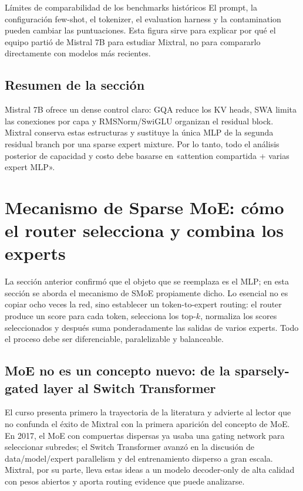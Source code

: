 \documentclass[a4paper]{article}
\begin{document}
\begin{warningbox}{Límites de comparabilidad de los benchmarks históricos}
El prompt, la configuración few-shot, el tokenizer, el evaluation harness y la contamination pueden cambiar las puntuaciones. Esta figura sirve para explicar por qué el equipo partió de Mistral 7B para estudiar Mixtral, no para compararlo directamente con modelos más recientes.
\end{warningbox}

\subsection{Resumen de la sección}

Mistral 7B ofrece un dense control claro: GQA reduce los KV heads, SWA limita las conexiones por capa y RMSNorm/SwiGLU organizan el residual block. Mixtral conserva estas estructuras y sustituye la única MLP de la segunda residual branch por una sparse expert mixture. Por lo tanto, todo el análisis posterior de capacidad y costo debe basarse en «attention compartida + varias expert MLP».
\section{Mecanismo de Sparse MoE: cómo el router selecciona y combina los experts}

La sección anterior confirmó que el objeto que se reemplaza es el MLP; en esta sección se aborda el mecanismo de SMoE propiamente dicho. Lo esencial no es copiar ocho veces la red, sino establecer un token-to-expert routing: el router produce un score para cada token, selecciona los top-$k$, normaliza los scores seleccionados y después suma ponderadamente las salidas de varios experts. Todo el proceso debe ser diferenciable, paralelizable y balanceable.

\subsection{MoE no es un concepto nuevo: de la sparsely-gated layer al Switch Transformer}

El curso presenta primero la trayectoria de la literatura y advierte al lector que no confunda el éxito de Mixtral con la primera aparición del concepto de MoE. En 2017, el MoE con compuertas dispersas ya usaba una gating network para seleccionar subredes; el Switch Transformer avanzó en la discusión de data/model/expert parallelism y del entrenamiento disperso a gran escala. Mixtral, por su parte, lleva estas ideas a un modelo decoder-only de alta calidad con pesos abiertos y aporta routing evidence que puede analizarse.
\end{document}
